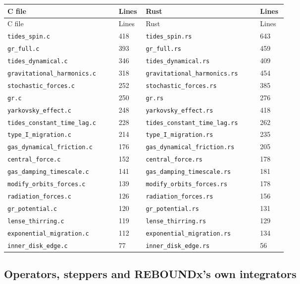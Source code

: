 \documentclass[11pt]{article}
\begin{document}
\begin{longtable}{L{0.371\linewidth}L{0.097\linewidth}L{0.385\linewidth}L{0.097\linewidth}}
\toprule
C file & Lines & Rust & Lines \\
\midrule
\endfirsthead
\toprule
C file & Lines & Rust & Lines \\
\midrule
\endhead
\texttt{tides\_spin.c} & 418 & \texttt{tides\_spin.rs} & 643 \\
\texttt{gr\_full.c} & 393 & \texttt{gr\_full.rs} & 459 \\
\texttt{tides\_dynamical.c} & 346 & \texttt{tides\_dynamical.rs} & 409 \\
\texttt{gravitational\_harmonics.c} & 318 & \texttt{gravitational\_harmonics.rs} & 454 \\
\texttt{stochastic\_forces.c} & 252 & \texttt{stochastic\_forces.rs} & 385 \\
\texttt{gr.c} & 250 & \texttt{gr.rs} & 276 \\
\texttt{yarkovsky\_effect.c} & 248 & \texttt{yarkovsky\_effect.rs} & 418 \\
\texttt{tides\_constant\_time\_lag.c} & 228 & \texttt{tides\_constant\_time\_lag.rs} & 262 \\
\texttt{type\_I\_migration.c} & 214 & \texttt{type\_I\_migration.rs} & 235 \\
\texttt{gas\_dynamical\_friction.c} & 176 & \texttt{gas\_dynamical\_friction.rs} & 205 \\
\texttt{central\_force.c} & 152 & \texttt{central\_force.rs} & 178 \\
\texttt{gas\_damping\_timescale.c} & 141 & \texttt{gas\_damping\_timescale.rs} & 181 \\
\texttt{modify\_orbits\_forces.c} & 139 & \texttt{modify\_orbits\_forces.rs} & 178 \\
\texttt{radiation\_forces.c} & 126 & \texttt{radiation\_forces.rs} & 156 \\
\texttt{gr\_potential.c} & 120 & \texttt{gr\_potential.rs} & 131 \\
\texttt{lense\_thirring.c} & 119 & \texttt{lense\_thirring.rs} & 129 \\
\texttt{exponential\_migration.c} & 112 & \texttt{exponential\_migration.rs} & 134 \\
\texttt{inner\_disk\_edge.c} & 77 & \texttt{inner\_disk\_edge.rs} & 56 \\
\bottomrule
\end{longtable}

\subsection{Operators, steppers and REBOUNDx's own integrators}
\end{document}

